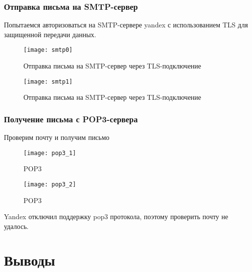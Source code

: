 \subsubsection{Отправка письма на SMTP-сервер}

Попытаемся авторизоваться на SMTP-сервере yandex с использованием TLS для защищенной передачи данных.


\begin{figure}[H]
	\begin{center}
		\texttt{[image: smtp0]}
		\caption{Отправка письма на SMTP-сервер через TLS-подключение}
		\label{pic:pic_name} %
	\end{center}
\end{figure}

\begin{figure}[H]
	\begin{center}
		\texttt{[image: smtp1]}
		\caption{Отправка письма на SMTP-сервер через TLS-подключение}
		\label{pic:pic_name} %
	\end{center}
\end{figure}



\subsubsection{Получение письма с POP3-сервера}

Проверим почту и получим письмо 

\begin{figure}[H]
	\begin{center}
		\texttt{[image: pop3\_1]}
		\caption{POP3} 
		\label{pic:pic_name} %
	\end{center}
\end{figure}

\begin{figure}[H]
	\begin{center}
		\texttt{[image: pop3\_2]}
		\caption{POP3} 
		\label{pic:pic_name} %
	\end{center}
\end{figure}

Yandex отключил поддержку pop3 протокола, поэтому проверить почту не удалось.


\section{Выводы}

